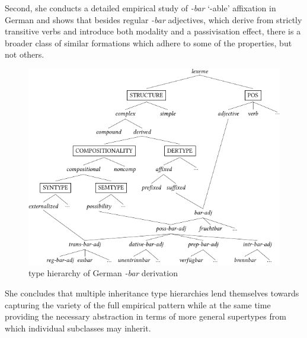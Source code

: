 \documentclass[output=paper
	        ,collection
	        ,collectionchapter
 	        ,biblatex
                ,babelshorthands
                ,newtxmath
                ,draftmode
                ,colorlinks, citecolor=brown
]{langscibook}
\begin{document}
Second, she conducts a detailed empirical study of \textit{-bar}
`-able' affixation in German and shows that besides regular
\textit{-bar} adjectives, which derive from strictly transitive verbs and
introduce both modality and a  passivisation effect, there is a 
broader class of similar formations which adhere to some of the
properties, but not others.%

\begin{figure}[htb]
  \centering
  \includegraphics[scale=1.2]{figures/Riehemann-crop.pdf}
  
  \caption{ type hierarchy of German \textit{-bar} derivation}
  \label{fig:Riehemann}
\end{figure}

She concludes that multiple inheritance type hierarchies lend
themselves towards capturing the variety of the full empirical pattern
while at the same time providing the necessary abstraction in terms of
more general supertypes from which individual subclasses may inherit. 

\ea
 \label{fig:riehemannBar}
\z
\end{document}
